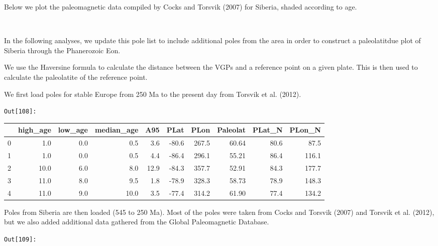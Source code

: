 \documentclass[11pt]{article}
\begin{document}
    Below we plot the paleomagnetic data compiled by Cocks and Torsvik
(2007) for Siberia, shaded according to age.


    \begin{center}
    \end{center}
    { \hspace*{\fill} \\}
    
    In the following analyses, we update this pole list to include
additional poles from the area in order to construct a paleolatitdue
plot of Siberia through the Phanerozoic Eon.

    We use the Haversine formula to calculate the distance between the VGPs
and a reference point on a given plate. This is then used to calculate
the paleolatite of the reference point.


    We first load poles for stable Europe from 250 Ma to the present day
from Torsvik et al. (2012).

\texttt{\color{outcolor}Out[{\color{outcolor}108}]:}
    
    {\tiny\begin{tabular}{lrrrrrrrrr}
\toprule
{} &  high\_age &  low\_age &  median\_age &   A95 &  PLat &   PLon &  Paleolat &  PLat\_N &  PLon\_N \\
\midrule
0 &       1.0 &      0.0 &         0.5 &   3.6 & -80.6 &  267.5 &     60.64 &    80.6 &    87.5 \\
1 &       1.0 &      0.0 &         0.5 &   4.4 & -86.4 &  296.1 &     55.21 &    86.4 &   116.1 \\
2 &      10.0 &      6.0 &         8.0 &  12.9 & -84.3 &  357.7 &     52.91 &    84.3 &   177.7 \\
3 &      11.0 &      8.0 &         9.5 &   1.8 & -78.9 &  328.3 &     58.73 &    78.9 &   148.3 \\
4 &      11.0 &      9.0 &        10.0 &   3.5 & -77.4 &  314.2 &     61.90 &    77.4 &   134.2 \\
\bottomrule
\end{tabular}}
    

    Poles from Siberia are then loaded (545 to 250 Ma). Most of the poles
were taken from Cocks and Torsvik (2007) and Torsvik et al. (2012), but
we also added additional data gathered from the Global Paleomagnetic
Database.

\texttt{\color{outcolor}Out[{\color{outcolor}109}]:}
    
\end{document}
